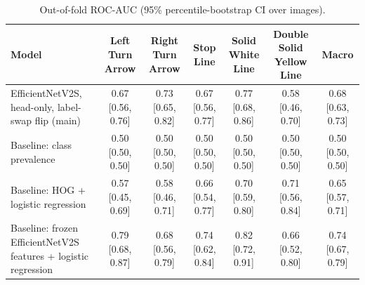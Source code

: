\begin{table}[t]
\centering
\small
\caption{Out-of-fold ROC-AUC (95\% percentile-bootstrap CI over images).}
\begin{tabular}{lcccccc}
\toprule
Model & Left Turn Arrow & Right Turn Arrow & Stop Line & Solid White Line & Double Solid Yellow Line & Macro \\
\midrule
EfficientNetV2S, head-only, label-swap flip  (main) & 0.67 [0.56, 0.76] & 0.73 [0.65, 0.82] & 0.67 [0.56, 0.77] & 0.77 [0.68, 0.86] & 0.58 [0.46, 0.70] & 0.68 [0.63, 0.73] \\
Baseline: class prevalence & 0.50 [0.50, 0.50] & 0.50 [0.50, 0.50] & 0.50 [0.50, 0.50] & 0.50 [0.50, 0.50] & 0.50 [0.50, 0.50] & 0.50 [0.50, 0.50] \\
Baseline: HOG + logistic regression & 0.57 [0.45, 0.69] & 0.58 [0.46, 0.71] & 0.66 [0.54, 0.77] & 0.70 [0.59, 0.80] & 0.71 [0.56, 0.84] & 0.65 [0.57, 0.71] \\
Baseline: frozen EfficientNetV2S features + logistic regression & 0.79 [0.68, 0.87] & 0.68 [0.56, 0.79] & 0.74 [0.62, 0.84] & 0.82 [0.72, 0.91] & 0.66 [0.52, 0.80] & 0.74 [0.67, 0.79] \\
\bottomrule
\end{tabular}
\end{table}
